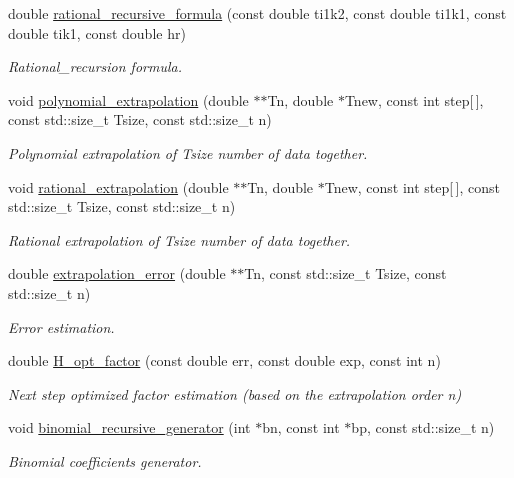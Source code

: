 \begin{DoxyCompactItemize}
double \hyperlink{namespaceEP_afe6d08bb36343e39ebbbd4406dc9989f}{rational\+\_\+recursive\+\_\+formula} (const double ti1k2, const double ti1k1, const double tik1, const double hr)
\begin{DoxyCompactList}\small\item\em Rational\+\_\+recursion formula. \end{DoxyCompactList}\item 
void \hyperlink{namespaceEP_ae89d6690a891336eef708e90e575a2be}{polynomial\+\_\+extrapolation} (double $\ast$$\ast$Tn, double $\ast$Tnew, const int step\mbox{[}$\,$\mbox{]}, const std\+::size\+\_\+t Tsize, const std\+::size\+\_\+t n)
\begin{DoxyCompactList}\small\item\em Polynomial extrapolation of Tsize number of data together. \end{DoxyCompactList}\item 
void \hyperlink{namespaceEP_a069470acd4f6c52b2ebb68afcf4528ab}{rational\+\_\+extrapolation} (double $\ast$$\ast$Tn, double $\ast$Tnew, const int step\mbox{[}$\,$\mbox{]}, const std\+::size\+\_\+t Tsize, const std\+::size\+\_\+t n)
\begin{DoxyCompactList}\small\item\em Rational extrapolation of Tsize number of data together. \end{DoxyCompactList}\item 
double \hyperlink{namespaceEP_ab0499a8ae6cab209fc0cca6a47b166f3}{extrapolation\+\_\+error} (double $\ast$$\ast$Tn, const std\+::size\+\_\+t Tsize, const std\+::size\+\_\+t n)
\begin{DoxyCompactList}\small\item\em Error estimation. \end{DoxyCompactList}\item 
double \hyperlink{namespaceEP_a6d54b765511d661bb4267799ff1a804f}{H\+\_\+opt\+\_\+factor} (const double err, const double exp, const int n)
\begin{DoxyCompactList}\small\item\em Next step optimized factor estimation (based on the extrapolation order n) \end{DoxyCompactList}\item 
void \hyperlink{namespaceEP_a92c709f3757c872402d2fcf954c3e2de}{binomial\+\_\+recursive\+\_\+generator} (int $\ast$bn, const int $\ast$bp, const std\+::size\+\_\+t n)
\begin{DoxyCompactList}\small\item\em Binomial coefficients generator. \end{DoxyCompactList}\item 
$$
\end{DoxyCompactItemize}
